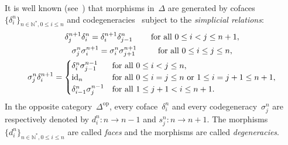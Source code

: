\documentclass[pdftex]{sigma}
\numberwithin{equation}{section}
\newcommand{\co}{\colon}
\newcommand{\id}{\mathrm{id}}
\newcommand{\opp}{\mathrm{op}}
\newcommand{\N}{\mathbb{N}}
\begin{document}
It is well known (see~\cite[Lemma 5.1]{MCLHomology}) that morphisms in~$\Delta$ are generated by cofaces $\{\delta_i^n\}_{n\in \N^*, 0\leq i \leq n}$ and codegeneracies~\smash{$\bigl\{\sigma_j^n\bigr\}_{n\in \N, 0\leq j \leq n}$} subject to the \textit{simplicial relations}:
\begingroup
\allowdisplaybreaks
\begin{gather}
\label{cofaces} \delta_j^{n+1} \delta_i^n= \delta_i^{n+1} \delta_{j-1}^n \hspace{7.9mm} \text{for all }0 \le i<j \le n+1, \\
\label{codegeneracies} \sigma_j^{n}\sigma_i^{n+1}=\sigma_i^n\sigma_{j+1}^{n+1} \hspace{9.2mm} \text{for all } 0\le i \leq j \le n,
\\
\label{compcofcod}\sigma_j^n\delta_i^{n+1}= \begin{cases}
\delta_i^n \sigma_{j-1}^{n-1} & \text{for all } 0\le i<j \le n, \\
\id_{n} & \text{for all } 0 \le i=j \le n \text{ or } 1\le i=j+1 \le n+1,\\
\delta_{i-1}^n\sigma_j^{n-1} & \text{for all } 1\le j+1 < i \le n+1.
\end{cases}
\end{gather}
\endgroup
In the op\-po\-site ca\-te\-go\-ry~$\Delta^{\opp}$, every co\-face~$\delta_i^n$ and every co\-de\-ge\-ne\-ra\-cy~$\sigma_j^n$ are re\-spec\-tively de\-noted by
$
d_i^n \co n \to n-1$ and $s_j^n \co n \to n+1$.
The morphisms $\{d_i^n\}_{n\in \N^*, 0\le i \le n}$ are called \textit{faces} and the morphisms \smash{$\bigl\{s_j^n\bigr\}_{n\in \N, 0 \le j \le n}$} are called \textit{degeneracies}.
\end{document}
